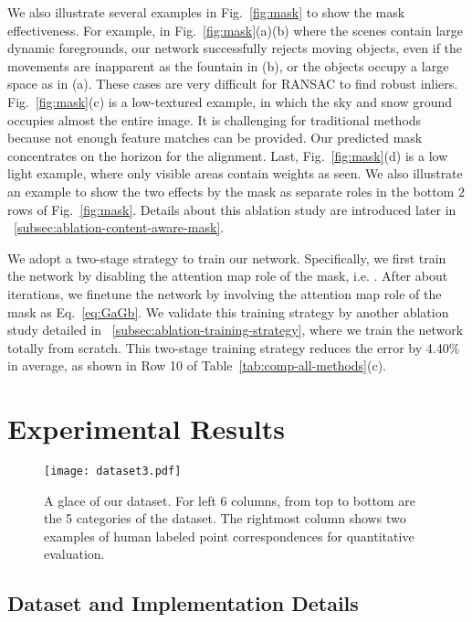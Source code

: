 \documentclass[runningheads]{llncs}
\begin{document}
We also illustrate several examples in Fig.~\ref{fig:mask} to show the mask effectiveness. For example, in {\color{black}Fig.~\ref{fig:mask}(a)(b) where the scenes contain large dynamic foregrounds, our network successfully rejects moving objects, even if the movements are inapparent as the fountain in (b), or the objects occupy a large space as in (a).} These cases are very difficult for RANSAC to find robust inliers. {\color{black}Fig.~\ref{fig:mask}(c) is a low-textured example, in which the sky and snow ground occupies almost the entire image. It is challenging for traditional methods because not enough feature matches can be provided. Our predicted mask concentrates on the horizon for the alignment.} Last, Fig.~\ref{fig:mask}(d) is a low light example, where only visible areas contain weights as seen. We also illustrate an example to show the two effects by the mask as separate roles in the bottom 2 rows of Fig.~\ref{fig:mask}. Details about this ablation study are introduced later in \secname~\ref{subsec:ablation-content-aware-mask}. 

We adopt a two-stage strategy to train our network. Specifically, we first train the network by disabling the attention map role of the mask, i.e. . After about  iterations, we finetune the network by involving the attention map role of the mask as Eq.~\ref{eq:GaGb}. We validate this training strategy by another ablation study detailed in \secname~\ref{subsec:ablation-training-strategy}, where we train the network totally from scratch. This two-stage training strategy reduces the error by 4.40\% in average, as shown in Row 10 of Table~\ref{tab:comp-all-methods}(c).
\section{Experimental Results}\label{sec:exp}

\begin{figure}[t]
  \centering
  \texttt{[image: dataset3.pdf]}\\
\caption{A glace of our dataset. For left 6 columns, from top to bottom are the 5 categories of the dataset. The rightmost column shows two examples of human labeled point correspondences for quantitative evaluation.}
  \label{fig:dataset}\end{figure}

\subsection{Dataset and Implementation Details}
\end{document}
